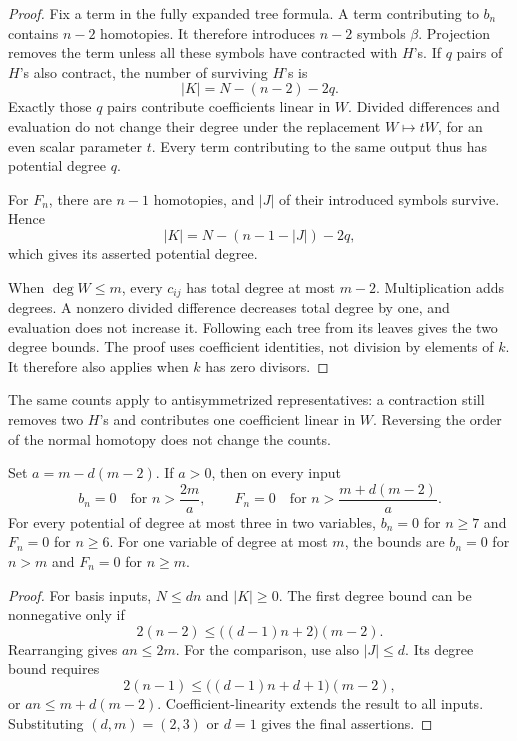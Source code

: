 \begin{proof}
Fix a term in the fully expanded tree formula. A term contributing
to \(b_n\) contains \(n-2\) homotopies. It therefore introduces
\(n-2\) symbols \(\beta\). Projection removes the term unless
all these symbols have contracted with \(H\)'s.
If \(q\) pairs of \(H\)'s also contract, the number of surviving
\(H\)'s is
\[
 |K|=N-(n-2)-2q.
\]
Exactly those \(q\) pairs contribute coefficients linear in \(W\).
Divided differences and evaluation do not change their degree under
the replacement \(W\mapsto tW\), for an even scalar parameter \(t\).
Every term contributing to the same output thus has potential degree \(q\).

For \(F_n\), there are \(n-1\) homotopies, and \(|J|\) of
their introduced symbols survive. Hence
\[
 |K|=N-(n-1-|J|)-2q,
\]
which gives its asserted potential degree.

When \(\deg W\le m\), every \(c_{ij}\) has total degree at most
\(m-2\). Multiplication adds degrees. A nonzero divided difference
decreases total degree by one, and evaluation does not increase it.
Following each tree from its leaves gives the two degree bounds.
The proof uses coefficient identities, not division by elements of \(k\).
It therefore also applies when \(k\) has zero divisors.
\end{proof}

The same counts apply to antisymmetrized representatives: a contraction
still removes two \(H\)'s and contributes one coefficient linear in \(W\).
Reversing the order of the normal homotopy does not change the counts.

\begin{corollary}\label{cor:co-finite-arity}
Set \(a=m-d(m-2)\). If \(a>0\), then on every input
\[
 b_n=0\quad\text{for }n>\frac{2m}{a},\qquad
 F_n=0\quad\text{for }n>\frac{m+d(m-2)}{a}.
\]
For every potential of degree at most three in two variables,
\(b_n=0\) for \(n\ge7\) and \(F_n=0\) for \(n\ge6\).
For one variable of degree at most \(m\), the bounds are
\(b_n=0\) for \(n>m\) and \(F_n=0\) for \(n\ge m\).
\end{corollary}

\begin{proof}
For basis inputs, \(N\le dn\) and \(|K|\ge0\).
The first degree bound can be nonnegative only if
\[
 2(n-2)\le\bigl((d-1)n+2\bigr)(m-2).
\]
Rearranging gives \(an\le2m\).
For the comparison, use also \(|J|\le d\).
Its degree bound requires
\[
 2(n-1)\le\bigl((d-1)n+d+1\bigr)(m-2),
\]
or \(an\le m+d(m-2)\).
Coefficient-linearity extends the result to all inputs.
Substituting \((d,m)=(2,3)\) or \(d=1\) gives the final assertions.
\end{proof}

